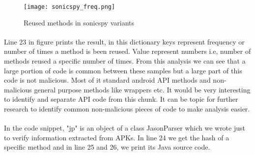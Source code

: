 \documentclass[../main.tex]{subfile}
\begin{document}
		\begin{figure}
			\texttt{[image: sonicspy\_freq.png]}
			\caption{Reused methods in sonicspy variants}
			\label{fig:sonicspy_freq}
		\end{figure}
		\paragraph{} Line 23 in figure prints the result, in this dictionary keys represent frequency or number of times a method is been reused. Value represent numbers i.e, number of methods reused a specific number of times. From this analysis we can see that a large portion of code is common between these samples but a large part of this code is not malicious. Most of it standard android API methods and non-malicious general purpose methods like wrappers etc. It would be very interesting to identify and separate API code from this chunk. It can be topic for further research to identify common non-malicious pieces of code to make analysis easier.
		
		\paragraph{} In the code snippet, "jp" is an object of a class JasonParser which we wrote just to verify information extracted from APKs. In line 24 we get the hash of a specific method and in line 25 and 26, we print its Java source code. 		
		
\end{document}

